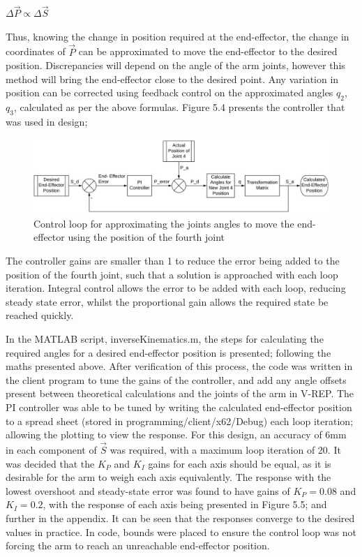 \documentclass[12pt,openany,a4paper]{book}
\begin{document}
\vspace{\baselineskip}
\begin{center}
$\Delta \vec{P} \propto \Delta \vec{S}$
\end{center}

Thus, knowing the change in position required at the end-effector, the change in coordinates of $\vec{P}$ can be approximated to move the end-effector to the desired position. Discrepancies will depend on the angle of the arm joints, however this method will bring the end-effector close to the desired point. Any variation in position can be corrected using feedback control on the approximated angles $q_2$, $q_3$, calculated as per the above formulas. Figure 5.4 presents the controller that was used in design;


\begin{center}
\begin{figure}[htb]
  \includegraphics[width=1.10\linewidth]{inv_kinematics_and_control.jpg}
\caption{Control loop for approximating the joints angles to move the end-effector using the position of the fourth joint}
\end{figure}
\end{center}

The controller gains are smaller than 1 to reduce the error being added to the position of the fourth joint, such that a solution is approached with each loop iteration. Integral control allows the error to be added with each loop, reducing steady state error, whilst the proportional gain allows the required state be reached quickly.

In the MATLAB script, inverseKinematics.m, the steps for calculating the required angles for a desired end-effector position is presented; following the maths presented above. After verification of this process, the code was written in the client program to tune the gains of the controller, and add any angle offsets present between theoretical calculations and the joints of the arm in V-REP. The PI controller was able to be tuned by writing the calculated end-effector position to a spread sheet (stored in programming/client/x62/Debug) each loop iteration; allowing the plotting to view the response. For this design, an accuracy of 6mm in each component of $\vec{S}$ was required, with a maximum loop iteration of 20. It was decided that the $K_P$ and $K_I$ gains for each axis should be equal, as it is desirable for the arm to weigh each axis equivalently. The response with the lowest overshoot and steady-state error was found to have gains of $K_P = 0.08$ and $K_I = 0.2$, with the response of each axis being presented in Figure 5.5; and further in the appendix. It can be seen that the responses converge to the desired values in practice. In code, bounds were placed to ensure the control loop was not forcing the arm to reach an unreachable end-effector position.
\end{document}
